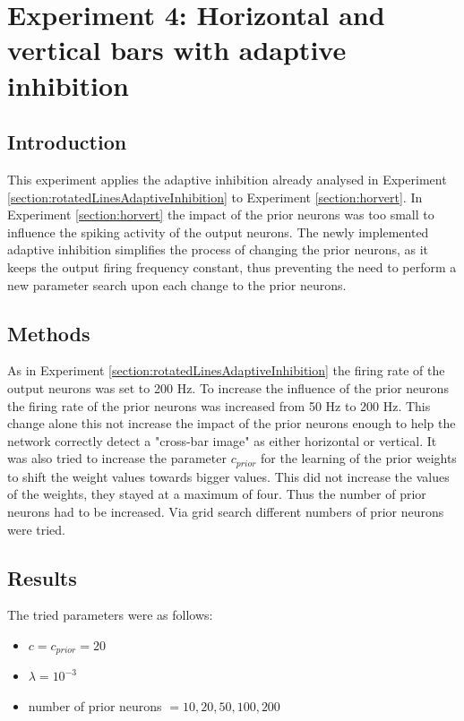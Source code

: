 \section{Experiment 4: Horizontal and vertical bars with adaptive inhibition}
\label{section:horvertAdaptiveInhibition}

\subsection{Introduction}

This experiment applies the adaptive inhibition already analysed in Experiment \ref{section:rotatedLinesAdaptiveInhibition} to Experiment \ref{section:horvert}. In Experiment \ref{section:horvert} the impact of the prior neurons was too small to influence the spiking activity of the output neurons. The newly implemented adaptive inhibition simplifies the process of changing the prior neurons, as it keeps the output firing frequency constant, thus preventing the need to perform a new parameter search upon each change to the prior neurons.

\subsection{Methods}

As in Experiment \ref{section:rotatedLinesAdaptiveInhibition} the firing rate of the output neurons was set to 200 Hz. To increase the influence of the prior neurons the firing rate of the prior neurons was increased from  50 Hz to 200 Hz. This change alone this not increase the impact of the prior neurons enough to help the network correctly detect a "cross-bar image" as either horizontal or vertical. It was also tried to increase the parameter $c_{prior}$ for the learning of the prior weights to shift the weight values towards bigger values. This did not increase the values of the weights, they stayed at a maximum of four. Thus the number of prior neurons had to be increased. Via grid search different numbers of prior neurons were tried.

\subsection{Results}

The tried parameters were as follows:
\begin{itemize}
  \item $c = c_{prior} = 20$
  \item $\lambda = 10^{-3}$
  \item number of prior neurons $ = 10, 20, 50, 100, 200$
\end{itemize}

